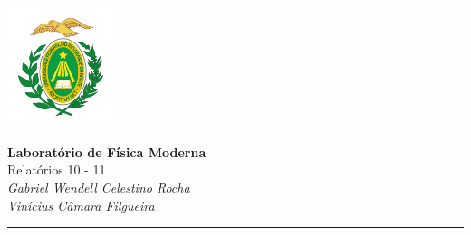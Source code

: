\documentclass[12pt,a4paper]{article}
\begin{document}
\textcolor{UM_Brown}{
\begin{minipage}{0.1\textwidth}
    \begin{flushleft}
        \includegraphics[height=3.5cm]{Figures/UFRN_Brasao.png}
    \end{flushleft}
\end{minipage}
\begin{minipage}{0.8\textwidth}
    \begin{center}
        \textbf{\Large Laboratório de Física Moderna}\\
        \vspace{5pt}
        Relatórios 10 - 11 \\
        \vspace{20pt}
        \textit{Gabriel Wendell Celestino Rocha} \\
        \vspace{5pt}
        \textit{Vinícius Câmara Filgueira}
    \end{center}
\end{minipage}
\vspace{10pt}
\hrule
}



\end{document}
